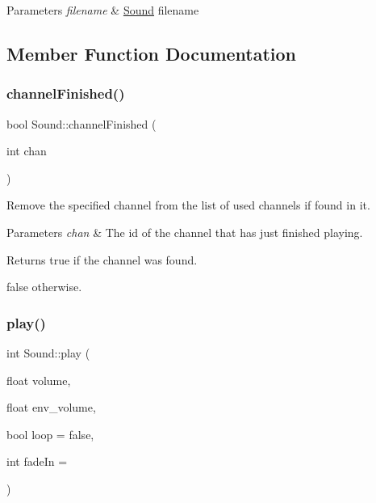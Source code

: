 \begin{DoxyParams}{Parameters}
{\em filename} & \hyperlink{class_sound}{Sound} filename \\
\hline
\end{DoxyParams}


\subsection{Member Function Documentation}
\mbox{\label{class_sound_a30c16881e13d91d31553af3b17886a5c}} 
\subsubsection{\texorpdfstring{channel\+Finished()}{channelFinished()}}
{\footnotesize\ttfamily bool Sound\+::channel\+Finished (\begin{DoxyParamCaption}\item[{int}]{chan }\end{DoxyParamCaption})}



Remove the specified channel from the list of used channels if found in it. 


\begin{DoxyParams}{Parameters}
{\em chan} & The id of the channel that has just finished playing. \\
\hline
\end{DoxyParams}
\begin{DoxyReturn}{Returns}
true if the channel was found. 

false otherwise. 
\end{DoxyReturn}
\mbox{\label{class_sound_ad5edcf094481b5b2f5e12451a4c99a13}} 
\subsubsection{\texorpdfstring{play()}{play()}}
{\footnotesize\ttfamily int Sound\+::play (\begin{DoxyParamCaption}\item[{float}]{volume,  }\item[{float}]{env\+\_\+volume,  }\item[{bool}]{loop = {\ttfamily false},  }\item[{int}]{fade\+In = {} }\end{DoxyParamCaption})}



